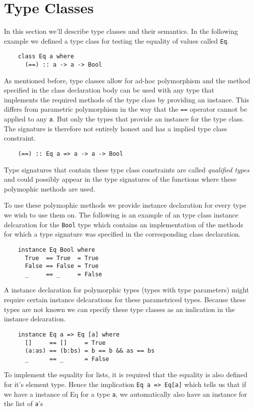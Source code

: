 \section{Type Classes}
In this section we'll describe type classes and their semantics. In the
following example we defined a type class for testing the equality of values
called \texttt{Eq}.

\begin{verbatim}
    class Eq a where
      (==) :: a -> a -> Bool
\end{verbatim}

As mentioned before, type classes allow for ad-hoc polymorphism and the method
specified in the class declaration body can be used with any type that
implements the required methods of the type class by providing an instance.
This differs from parametric polymorphism in the way that the \texttt{==}
operator cannot be applied to any \texttt{a}. But only the types that provide an
instance for the type class. The signature is therefore not entirely honest and
has a implied type class constraint.
\begin{verbatim}
    (==) :: Eq a => a -> a -> Bool
\end{verbatim}
Type signatures that contain these type class constraints are called
\textit{qualified types} and could possibly appear in the type signatures of the
functions where these polymophic methods are used.

To use these polymophic methods we provide instance declaration for every type
we wish to use them on. The following is an example of an type class instance
delcaration for the \texttt{Bool} type which contains an implementation of the
methods for which a type signature was specified in the corresponding class
declaration.
\begin{verbatim}
    instance Eq Bool where
      True  == True  = True
      False == False = True
      _     == _     = False
\end{verbatim}

A instance declaration for polymorphic types (types with type parameters) might
require certain instance delcarations for these parametriced types. Because
these types are not known we can specify these type classes as an imlication in
the instance delcaration.
\begin{verbatim}
    instance Eq a => Eq [a] where
      []     == []     = True
      (a:as) == (b:bs) = b == b && as == bs
      _      == _      = False
\end{verbatim}
To implement the equality for lists, it is required that the equality is also
defined for it's element type. Hence the implication \texttt{Eq a => Eq[a]}
which tells us that if we have a instance of Eq for a type \texttt{a}, we
automatically also have an instance for the list of \texttt{a}'s

